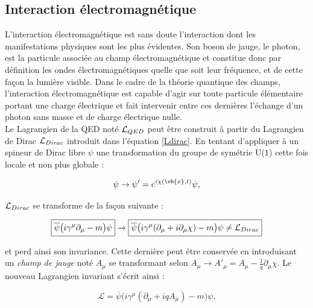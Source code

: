         \subsection{Interaction électromagnétique}

        L'interaction électromagnétique est sans doute l'interaction dont les manifestations physiques sont les plus évidentes. Son boson de jauge, le photon, est la particule associée au champ électromagnétique et constitue donc par définition les ondes électromagnétiques quelle que soit leur fréquence, et de cette façon la lumière visible. Dans le cadre de la théorie quantique des champs, l'interaction électromagnétique est capable d'agir sur toute particule élémentaire portant une charge électrique et fait intervenir entre ces dernières l'échange d'un photon sans masse et de charge électrique nulle. \\

        Le Lagrangien de la QED noté $\mathcal{L}_{\tiny QED}$ peut être construit à partir du Lagrangien de Dirac $\mathcal{L}_{\tiny Dirac}$ introduit dans l'équation \ref{Ldirac}. En tentant d'appliquer à un spineur de Dirac libre $\psi$ une transformation du groupe de symétrie U($1$) cette fois locale et non plus globale :

        \begin{equation}
            \psi\rightarrow\psi'=e^{i\chi(\vb{x},t)}\psi,
        \label{localU1}
        \end{equation}

        $\mathcal{L}_{\tiny Dirac}$ se transforme de la façon suivante :

        \begin{equation*}
            \boxed{\overline{\psi}\bigl(i\gamma^{\mu}\partial_{\mu}-m\bigr)\psi}\rightarrow\boxed{\overline{\psi}\bigl(i\gamma^{\mu}(\partial_{\mu}+i\partial_{\mu}\chi)-m\bigr)\psi\ne\mathcal{L}_{\tiny Dirac}}
        \end{equation*}

        et perd ainsi son invariance. Cette dernière peut être conservée en introduisant un \textit{champ de jauge} noté $A_{\mu}$ se transformant selon $A_{\mu}\rightarrow A'_{\mu}=A_{\mu}-\frac{1}{q}\partial_{\mu}\chi$. Le nouveau Lagrangien invariant s'écrit ainsi :

        \begin{equation}
            \mathcal{L}=\overline{\psi}\bigl(i\gamma^{\mu}(\partial_{\mu}+iqA_{\mu})-m\bigr)\psi.
        \end{equation}

